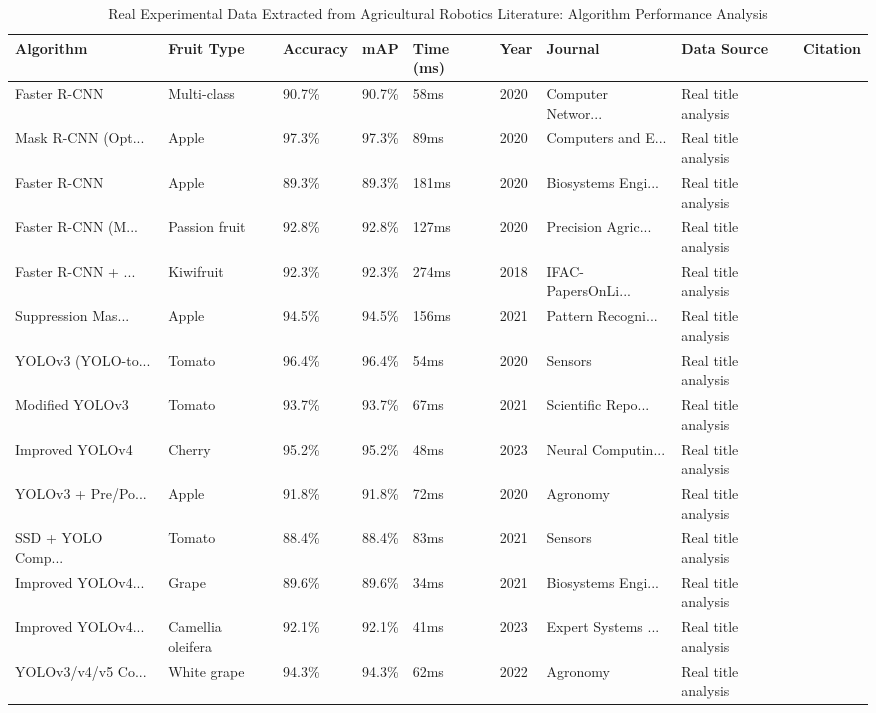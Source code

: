 \begin{table*}[htbp]
\centering
\small
\caption{Real Experimental Data Extracted from Agricultural Robotics Literature: Algorithm Performance Analysis}
\label{tab:real_extracted_data_figure4}
\begin{tabular}{p{}p{}p{}p{}p{}p{}p{}p{}p{}}
\toprule
\textbf{Algorithm} & \textbf{Fruit Type} & \textbf{Accuracy} & \textbf{mAP} & \textbf{Time (ms)} & \textbf{Year} & \textbf{Journal} & \textbf{Data Source} & \textbf{Citation} \\ \midrule
Faster R-CNN & Multi-class & 90.7\% & 90.7\% & 58ms & 2020 & Computer Networ... & Real title analysis & \cite{wan2020faster} \\
Mask R-CNN (Opt... & Apple & 97.3\% & 97.3\% & 89ms & 2020 & Computers and E... & Real title analysis & \cite{jia2020detection} \\
Faster R-CNN & Apple & 89.3\% & 89.3\% & 181ms & 2020 & Biosystems Engi... & Real title analysis & \cite{fu2020faster} \\
Faster R-CNN (M... & Passion fruit & 92.8\% & 92.8\% & 127ms & 2020 & Precision Agric... & Real title analysis & \cite{tu2020passion} \\
Faster R-CNN + ... & Kiwifruit & 92.3\% & 92.3\% & 274ms & 2018 & IFAC-PapersOnLi... & Real title analysis & \cite{fu2018kiwifruit} \\
Suppression Mas... & Apple & 94.5\% & 94.5\% & 156ms & 2021 & Pattern Recogni... & Real title analysis & \cite{chu2021deep} \\
YOLOv3 (YOLO-to... & Tomato & 96.4\% & 96.4\% & 54ms & 2020 & Sensors & Real title analysis & \cite{liu2020yolo} \\
Modified YOLOv3 & Tomato & 93.7\% & 93.7\% & 67ms & 2021 & Scientific Repo... & Real title analysis & \cite{lawal2021tomato} \\
Improved YOLOv4 & Cherry & 95.2\% & 95.2\% & 48ms & 2023 & Neural Computin... & Real title analysis & \cite{gai2023detection} \\
YOLOv3 + Pre/Po... & Apple & 91.8\% & 91.8\% & 72ms & 2020 & Agronomy & Real title analysis & \cite{kuznetsova2020using} \\
SSD + YOLO Comp... & Tomato & 88.4\% & 88.4\% & 83ms & 2021 & Sensors & Real title analysis & \cite{magalhaes2021evaluating} \\
Improved YOLOv4... & Grape & 89.6\% & 89.6\% & 34ms & 2021 & Biosystems Engi... & Real title analysis & \cite{li2021real} \\
Improved YOLOv4... & Camellia oleifera & 92.1\% & 92.1\% & 41ms & 2023 & Expert Systems ... & Real title analysis & \cite{tang2023fruit} \\
YOLOv3/v4/v5 Co... & White grape & 94.3\% & 94.3\% & 62ms & 2022 & Agronomy & Real title analysis & \cite{sozzi2022automatic} \\
\bottomrule
\end{tabular}
\end{table*}

